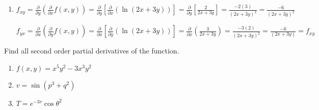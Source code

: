 \begin{Answer}
\begin{enumerate}
    $f_{yx} = \frac{\partial}{\partial x} \left( \frac{\partial}{\partial y} 
    f(x, y) \right) = \frac{\partial}{\partial x} \left[ \frac{\partial}{
    \partial y} \left( \frac{x^2}{x + y} \right) \right] = \frac{\partial}{
    \partial x} \left[ \frac{-x^2}{\left( x + y \right)^2} \right] = \frac{
    \left(x + y \right)^2 \left( -2x \right) - \left( -x^2 \right) \left( 2 
    (x + y ) \right)}{\left( x + y \right)^4} = \frac{\left(x^2 + 2xy + y^2 
    \right) \left(-2x \right) + x^2 \left(2x + 2y \right)}{\left( x + y \right)
    ^4} = \frac{-2x^3 - 4x^2y - 2xy^2 + 2x^3 + 2x^2y}{\left( x + y \right)^4} =
    \frac{-2x^2y - 2xy^2}{\left( x + y \right)^4} = f_{xy}$

    \item $f_{xy} = \frac{\partial}{\partial y} \left( \frac{\partial}{
    \partial x}f(x, y) \right) = \frac{\partial}{\partial y} \left[ \frac{
    \partial}{\partial x} \left( \ln{\left(2x + 3y \right)} \right) \right] = 
    \frac{\partial}{\partial y} \left[ \frac{2}{2x + 3y} \right] = \frac{-2 
    \left( 3 \right)}{ \left( 2x + 3y \right)^2} = \frac{-6}{\left( 2x + 3y 
    \right)^2}$

    $f_{yx} = \frac{\partial}{\partial x} \left( \frac{\partial}{\partial y}
    f(x, y) \right) = \frac{\partial}{\partial x} \left[ \frac{\partial}{
    \partial y} \left( \ln{ \left( 2x + 3y \right)} \right) \right] = \frac{
    \partial}{\partial x} \left( \frac{3}{2x + 3y} \right) = \frac{-3(2)}{
    \left( 2x + 3y \right)^2} = \frac{-6}{\left( 2x + 3y \right)} = f_{xy}$
\end{enumerate}
\end{Answer}

\begin{Exercise}[title = {Second Order Partial Derivatives}, label = second]
Find all second order partial derivatives of the function. 
\begin{enumerate}
\item $f(x, y) = x^5y^2 - 3x^3y^2$
\item $v = \sin{\left( p^3 + q^2 \right)}$
\item $T = e^{-3r} \cos{\theta^2}$
\end{enumerate}
\vspace{75mm}
\end{Exercise}

